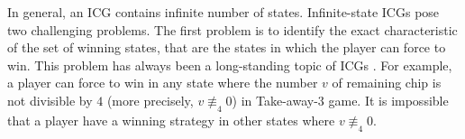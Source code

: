 \documentclass[review]{elsarticle}
\newcommand{\nmodulo}{\not \equiv}
\newcommand\eg{{\it e.g.}}
\begin{document}
		
%	
%	

	In general, an ICG contains infinite number of states. %
	Infinite-state ICGs pose two challenging problems.
	The first problem is to identify the exact characteristic of the set of winning states, that are the states in which the player can force to win.
	This problem has always been a long-standing topic of ICGs \cite{BeaBD2013,LiuZ2015,Sop2016,GurH2018}.
	For example, a player can force to win in any state where the number $v$ of remaining chip is not divisible by $4$ (more precisely, $v \nmodulo_4 0$) in Take-away-$3$ game.
	It is impossible that a player have a winning strategy in other states where $v \nmodulo_4 0$. %
	
\end{document}
